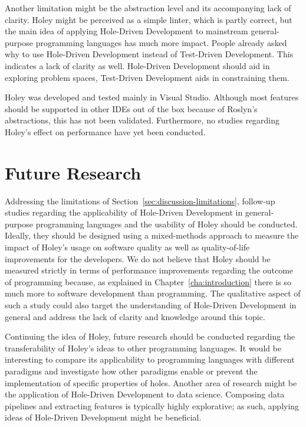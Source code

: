 Another limitation might be the abstraction level and its accompanying lack of clarity.
Holey might be perceived as a simple linter, which is partly correct, but the main idea of applying Hole-Driven Development to mainstream general-purpose programming languages has much more impact.
People already asked why to use Hole-Driven Development instead of Test-Driven Development.
This indicates a lack of clarity as well.
Hole-Driven Development should aid in exploring problem spaces, Test-Driven Development aids in constraining them.

Holey was developed and tested mainly in Visual Studio.
Although most features should be supported in other IDEs out of the box because of Roslyn's abstractions, this has not been validated.
Furthermore, no studies regarding Holey's effect on performance have yet been conducted.


\section{Future Research}
\label{sec:discussion-future-research}
Addressing the limitations of Section~\ref{sec:discussion-limitations}, follow-up studies regarding the applicability of Hole-Driven Development in general-purpose programming languages and the usability of Holey should be conducted.
Ideally, they should be designed using a mixed-methods approach to measure the impact of Holey's usage on software quality as well as quality-of-life improvements for the developers.
We do not believe that Holey should be measured strictly in terms of performance improvements regarding the outcome of programming because, as explained in Chapter~\ref{cha:introduction} there is so much more to software development than programming.
The qualitative aspect of such a study could also target the understanding of Hole-Driven Development in general and address the lack of clarity and knowledge around this topic.

Continuing the idea of Holey, future research should be conducted regarding the transferability of Holey's ideas to other programming languages.
It would be interesting to compare its applicability to programming languages with different paradigms and investigate how other paradigms enable or prevent the implementation of specific properties of holes.
Another area of research might be the application of Hole-Driven Development to data science.
Composing data pipelines and extracting features is typically highly explorative; as such, applying ideas of Hole-Driven Development might be beneficial.


